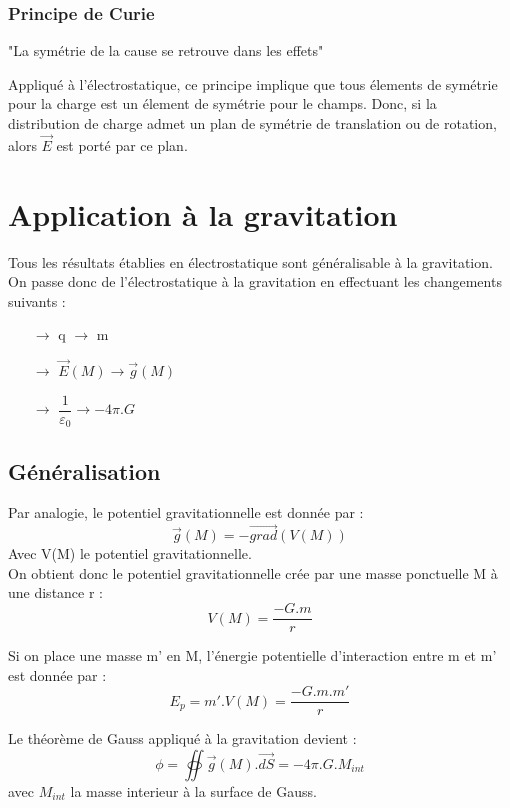 \subsubsection{Principe de Curie}
\begin{theo}
"La symétrie de la cause se retrouve dans les effets" 
\end{theo}
Appliqué à l'électrostatique, ce principe implique que tous élements de symétrie pour la charge est un élement de symétrie pour le champs. Donc, si la distribution de charge admet un plan de symétrie de translation ou de rotation, alors $\overrightarrow{E}$ est porté par ce plan.
\section{Application à la gravitation}
Tous les résultats établies en électrostatique sont généralisable à la gravitation.\\
On passe donc de l'électrostatique à la gravitation en effectuant les changements suivants : 
\begin{itemize}
 \item[$\rightarrow$] q $\rightarrow$ m
 \item[$\rightarrow$] $\overrightarrow{E}(M) \rightarrow \overrightarrow{g}(M)$
 \item[$\rightarrow$] $\dfrac{1}{\varepsilon_0} \rightarrow -4\pi.G$
\end{itemize}
\subsection{Généralisation}
\begin{de}
Par analogie, le potentiel gravitationnelle est donnée par : 
$$\overrightarrow{g}(M) = -\overrightarrow{grad}(V(M))$$
Avec V(M) le potentiel gravitationnelle.\\
On obtient donc le potentiel gravitationnelle crée par une masse ponctuelle M à une distance r :
$$V(M) = \dfrac{-G.m}{r}$$
\end{de}
\begin{de}
Si on place une masse m' en M, l'énergie potentielle d'interaction entre m et m' est donnée par :
$$E_p = m'.V(M) = \dfrac{-G.m.m'}{r}$$
\end{de}
\begin{prop}
Le théorème de Gauss appliqué à la gravitation devient : 
$$\phi = \oiint\overrightarrow{g}(M).\overrightarrow{dS} = -4\pi.G.M_{int}$$
avec $M_{int}$ la masse interieur à la surface de Gauss.
\end{prop}


